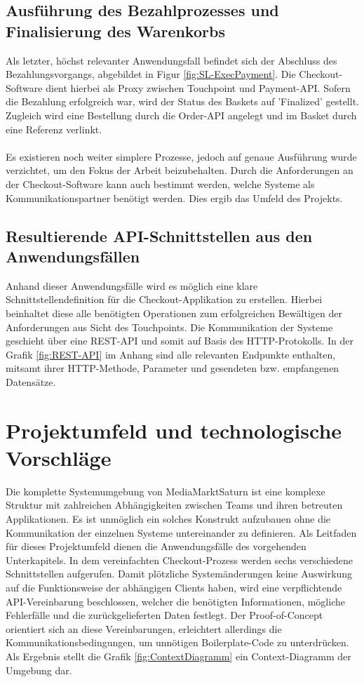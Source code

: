 \subsection{Ausführung des Bezahlprozesses und Finalisierung des Warenkorbs}

Als letzter, höchst relevanter Anwendungsfall befindet sich der Abschluss des Bezahlungsvorgangs, abgebildet in Figur \ref{fig:SL-ExecPayment}. Die Checkout-Software dient hierbei als Proxy zwischen Touchpoint und Payment-API. Sofern die Bezahlung erfolgreich war, wird der Status des Baskets auf 'Finalized' gestellt. Zugleich wird eine Bestellung durch die Order-API angelegt und im Basket durch eine Referenz verlinkt. \\\\

Es existieren noch weiter simplere Prozesse, jedoch auf genaue Ausführung wurde verzichtet, um den Fokus der Arbeit beizubehalten. Durch die Anforderungen an der Checkout-Software kann auch bestimmt werden, welche Systeme als Kommunikationspartner benötigt werden. Dies ergib das Umfeld des Projekts. 

\subsection{Resultierende API-Schnittstellen aus den Anwendungsfällen}

Anhand dieser Anwendungsfälle wird es möglich eine klare Schnittstellendefinition für die Checkout-Applikation zu erstellen. Hierbei beinhaltet diese alle benötigten Operationen zum erfolgreichen Bewältigen der Anforderungen aus Sicht des Touchpoints. Die Kommunikation der Systeme geschieht über eine \acrshort{REST}-API und somit auf Basis des \acrshort{HTTP}-Protokolls. In der Grafik \ref{fig:REST-API} im Anhang sind alle relevanten Endpunkte enthalten, mitsamt ihrer HTTP-Methode, Parameter und gesendeten bzw. empfangenen Datensätze.

\section{Projektumfeld und technologische Vorschläge}

Die komplette Systemumgebung von MediaMarktSaturn ist eine komplexe Struktur mit zahlreichen Abhängigkeiten zwischen Teams und ihren betreuten Applikationen. Es ist unmöglich ein solches Konstrukt aufzubauen ohne die Kommunikation der einzelnen Systeme untereinander zu definieren. Als Leitfaden für dieses Projektumfeld dienen die Anwendungsfälle des vorgehenden Unterkapitels. In dem vereinfachten Checkout-Prozess werden sechs verschiedene Schnittstellen aufgerufen. Damit plötzliche Systemänderungen keine Auswirkung auf die Funktionsweise der abhängigen Clients haben, wird eine verpflichtende API-Vereinbarung beschlossen, welcher die benötigten Informationen, mögliche Fehlerfälle und die zurückgelieferten Daten festlegt. Der Proof-of-Concept orientiert sich an diese Vereinbarungen, erleichtert allerdings die Kommunikationsbedingungen, um unnötigen \Gls{Boilerplate}-Code zu unterdrücken. Als Ergebnis stellt die Grafik \ref{fig:ContextDiagramm} ein Context-Diagramm der Umgebung dar.


